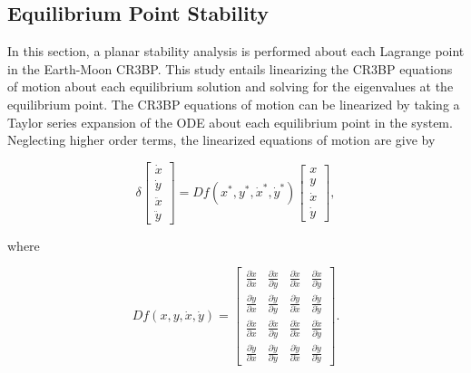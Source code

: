 \documentclass[11pt]{article} %
\begin{document}

\subsection{Equilibrium Point Stability}
In this section, a planar stability analysis is performed about each Lagrange point in the Earth-Moon CR3BP. This study entails linearizing the CR3BP equations of motion about each equilibrium solution and solving for the eigenvalues at the equilibrium point. The CR3BP equations of motion can be linearized by taking a Taylor series expansion of the ODE about each equilibrium point in the system. Neglecting higher order terms, the linearized equations of motion are give by

\begin{equation}
	\label{e:lin_eom}
	\delta\begin{bmatrix}\dot{x}\\\dot{y}\\\ddot{x}\\\ddot{y}\end{bmatrix} = Df\left(x^*,y^*,\dot{x}^*,\dot{y}^*\right)\begin{bmatrix}x\\y\\\dot{x}\\\dot{y}\end{bmatrix},
\end{equation}

\noindent
where

\doublespacing
\begin{equation}
	\label{e:df_raw}
	Df\left(x,y,\dot{x},\dot{y}\right) = 
	\begin{bmatrix} 
		\frac{\partial \dot{x}}{\partial x} & \frac{\partial \dot{x}}{\partial y} & \frac{\partial \dot{x}}{\partial \dot{x}}  & \frac{\partial \dot{x}}{\partial \dot{y}} \\ 
		\frac{\partial \dot{y}}{\partial x} & \frac{\partial \dot{y}}{\partial y} & \frac{\partial \dot{y}}{\partial \dot{x}} & \frac{\partial \dot{y}}{\partial \dot{y}} \\
		\frac{\partial \ddot{x}}{\partial x} & \frac{\partial \ddot{x}}{\partial y} & \frac{\partial \ddot{x}}{\partial \dot{x}} & \frac{\partial \ddot{x}}{\partial \dot{y}} \\
		\frac{\partial \ddot{y}}{\partial x} & \frac{\partial \ddot{y}}{\partial y} & \frac{\partial \ddot{y}}{\partial \dot{x}} & \frac{\partial \ddot{y}}{\partial \dot{y}}
	\end{bmatrix}.
\end{equation}
\singlespacing
\end{document}
